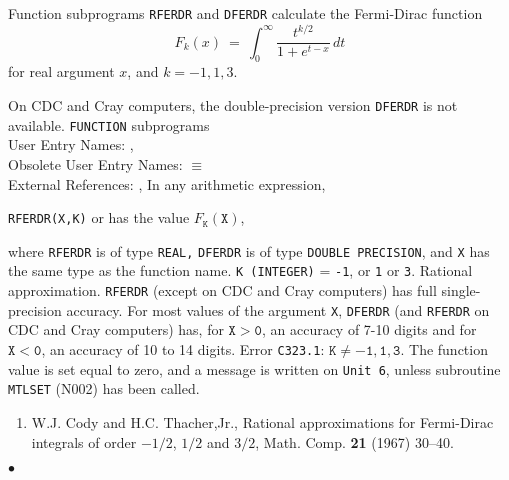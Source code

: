                        
                
\Submitter{}                          
                    
Function subprograms {\tt RFERDR} and {\tt DFERDR} calculate
the Fermi-Dirac function
$$ F_k(x) \ = \ \int^\infty_0\frac{t^{k/2}}{1+e^{t-x}}\,dt $$
for real argument $x$, and $k=-1,1,3.$
\par
On CDC and Cray computers, the double-precision version
{\tt DFERDR} is not available.
\Structure
{\tt FUNCTION} subprograms\\
User Entry Names: ,  \\
Obsolete User Entry Names:  $\equiv$  \\
External References: , 
\Usage
In any arithmetic expression,
\begin{center}
{\tt RFERDR(X,K)} \quad or  \quad has the value
\quad $F_{\mathtt{K}}(\mathtt{X})$,
\end{center}
where {\tt RFERDR} is of type  {\tt REAL,} {\tt DFERDR} is of type
{\tt DOUBLE PRECISION}, and {\tt X} has the same type as the
function name. {\tt K (INTEGER)} = {\tt -1}, or {\tt 1} or {\tt 3}.
\Method
Rational approximation.
\Accuracy
{\tt RFERDR} (except on CDC and Cray computers)
has full single-precision accuracy.
For most values of the argument {\tt X}, {\tt DFERDR}
(and {\tt RFERDR} on CDC and Cray computers) has, for $\mathtt{X>0}$,
an accuracy of 7-10 digits and for $\mathtt{X<0}$, an accuracy of
10 to 14 digits.
\Errorh
Error {\tt C323.1}: $\mathtt{K \ne -1,1,3}.$
The function value is set equal to zero, and a message is written on
{\tt Unit 6}, unless subroutine {\tt MTLSET} (N002) has been called.
\Refer
\begin{enumerate}
\item W.J. Cody and H.C. Thacher,Jr., Rational approximations for
Fermi-Dirac integrals of order $-1/2$, $1/2$ and $3/2$,
Math. Comp. {\bf 21} (1967) 30--40.
\end{enumerate}
$\bullet$
